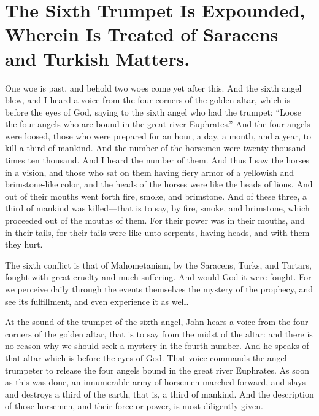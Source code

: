 \chapter[Sermon 41. The Sixth Trumpet Is Expounded, Wherein Is Treated of Saracens and Turkish Matters.]{The Sixth Trumpet Is Expounded, Wherein Is Treated of Saracens and Turkish Matters.}
\label{sermon:041}

One woe is past, and behold two woes come yet after this. And the sixth angel blew, and I heard a voice from the four corners of the golden altar, which is before the eyes of God, saying to the sixth angel who had the trumpet: “Loose the four angels who are bound in the great river Euphrates.” And the four angels were loosed, those who were prepared for an hour, a day, a month, and a year, to kill a third of mankind. And the number of the horsemen were twenty thousand times ten thousand. And I heard the number of them. And thus I saw the horses in a vision, and those who sat on them having fiery armor of a yellowish and brimstone-like color, and the heads of the horses were like the heads of lions. And out of their mouths went forth fire, smoke, and brimstone. And of these three, a third of mankind was killed—that is to say, by fire, smoke, and brimstone, which proceeded out of the mouths of them. For their power was in their mouths, and in their tails, for their tails were like unto serpents, having heads, and with them they hurt.

The sixth conflict is that of Mahometanism, by the Saracens, Turks, and Tartars, fought with great cruelty and much suffering. And would God it were fought. For we perceive daily through the events themselves the mystery of the prophecy, and see its fulfillment, and even experience it as well.

At the sound of the trumpet of the sixth angel, John hears a voice from the four corners of the golden altar, that is to say from the midst of the altar: and there is no reason why we should seek a mystery in the fourth number. And he speaks of that altar which is before the eyes of God. That voice commands the angel trumpeter to release the four angels bound in the great river Euphrates. As soon as this was done, an innumerable army of horsemen marched forward, and slays and destroys a third of the earth, that is, a third of mankind. And the description of those horsemen, and their force or power, is most diligently given.

